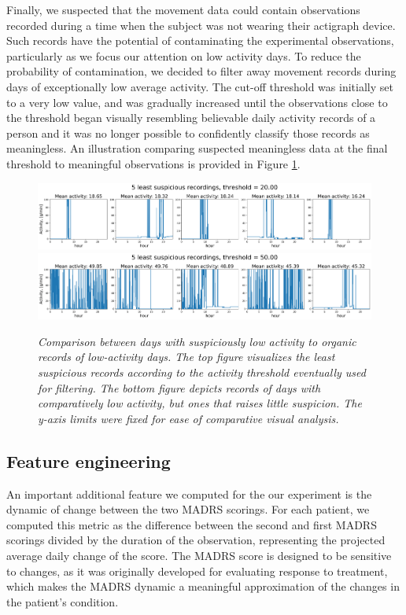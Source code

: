 \documentclass[12pt]{article}
\begin{document}
Finally, we suspected that the movement data could contain observations recorded during a time when the subject was not wearing their actigraph device. Such records have the potential of contaminating the experimental observations, particularly as we focus our attention on low activity days. To reduce the probability of contamination, we decided to filter away movement records during days of exceptionally low average activity. The cut-off threshold was initially set to a very low value, and was gradually increased until the observations close to the threshold began visually resembling believable daily activity records of a person and it was no longer possible to confidently classify those records as meaningless. An illustration comparing suspected meaningless data at the final threshold to meaningful observations is provided in Figure \ref{fig:sus}.

\begin{figure}[!h]
    \centering
    \includegraphics[width=.99\textwidth]{images/sus.png}
    \includegraphics[width=.99\textwidth]{images/not_sus.png}
    \captionsetup{justification=centering}
    \caption{\textit{Comparison between days with suspiciously low activity to organic records of low-activity days. The top figure visualizes the least suspicious records according to the activity threshold eventually used for filtering. The bottom  figure depicts records of days with comparatively low activity, but ones that raises little suspicion. The y-axis limits were fixed for ease of comparative visual analysis.}}
    \label{fig:sus}
\end{figure}


\subsection{Feature engineering}

An important additional feature we computed for the our experiment is the dynamic of change between the two MADRS scorings. For each patient, we computed this metric as the difference between the second and first MADRS scorings divided by the duration of the observation, representing the projected average daily change of the score. The MADRS score is designed to be sensitive to changes, as it was originally developed for evaluating response to treatment, which makes the MADRS dynamic a meaningful approximation of the changes in the patient's condition. 
\end{document}
